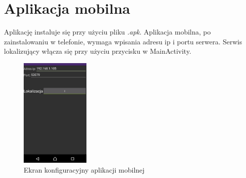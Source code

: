 	\section{Aplikacja mobilna}
	
	Aplikację instaluje się przy użyciu pliku \textit{.apk}. Aplikacja mobilna, po zainstalowaniu w telefonie, wymaga wpisania adresu ip i portu serwera. Serwis lokalizujący włącza się przy użyciu przycisku w MainActivity.
	\begin{figure}[H]			
		\centering
		\caption{Ekran konfiguracyjny aplikacji mobilnej}
		\includegraphics[width=0.3\textwidth]{apk_mobilna}
	\end{figure}